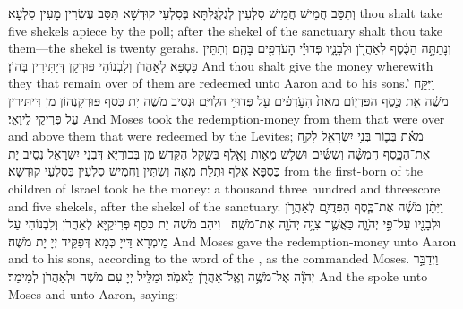 {וְתִסַּב חֲמֵישׁ חֲמֵישׁ סִלְעִין לְגֻלְגֻּלְתָּא בְּסִלְעֵי קוּדְשָׁא תִּסַּב עֶשְׂרִין מָעִין סִלְעָא׃}
{thou shalt take five shekels apiece by the poll; after the shekel of the sanctuary shalt thou take them—the shekel is twenty gerahs.}{}
{וְנָתַתָּ֣ה הַכֶּ֔סֶף לְאַהֲרֹ֖ן וּלְבָנָ֑יו פְּדוּיֵ֕י הָעֹדְפִ֖ים בָּהֶֽם׃}
{וְתִתֵּין כַּסְפָּא לְאַהֲרֹן וְלִבְנוֹהִי פּוּרְקַן דְּיַתִּירִין בְּהוֹן׃}
{And thou shalt give the money wherewith they that remain over of them are redeemed unto Aaron and to his sons.’}{}
{וַיִּקַּ֣ח מֹשֶׁ֔ה אֵ֖ת כֶּ֣סֶף הַפִּדְי֑וֹם מֵאֵת֙ הָעֹ֣דְפִ֔ים עַ֖ל פְּדוּיֵ֥י הַלְוִיִּֽם׃
}
{וּנְסֵיב מֹשֶׁה יָת כְּסַף פּוּרְקָנְהוֹן מִן דְּיַתִּירִין עַל פְּרִיקֵי לֵיוָאֵי׃}
{And Moses took the redemption-money from them that were over and above them that were redeemed by the Levites;}{}
{מֵאֵ֗ת בְּכ֛וֹר בְּנֵ֥י יִשְׂרָאֵ֖ל לָקַ֣ח אֶת־הַכָּ֑סֶף חֲמִשָּׁ֨ה וְשִׁשִּׁ֜ים וּשְׁלֹ֥שׁ מֵא֛וֹת וָאֶ֖לֶף בְּשֶׁ֥קֶל הַקֹּֽדֶשׁ׃
}
{מִן בְּכוֹרַיָּא דִּבְנֵי יִשְׂרָאֵל נְסֵיב יָת כַּסְפָּא אֶלֶף וּתְלָת מְאָה וְשִׁתִּין וַחֲמֵישׁ סִלְעִין בְּסִלְעֵי קוּדְשָׁא׃}
{from the first-born of the children of Israel took he the money: a thousand three hundred and threescore and five shekels, after the shekel of the sanctuary.}{}
{וַיִּתֵּ֨ן מֹשֶׁ֜ה אֶת־כֶּ֧סֶף הַפְּדֻיִ֛ם לְאַהֲרֹ֥ן וּלְבָנָ֖יו עַל־פִּ֣י יְהֹוָ֑ה כַּאֲשֶׁ֛ר צִוָּ֥ה יְהֹוָ֖ה אֶת־מֹשֶֽׁה׃ \petucha }
{וִיהַב מֹשֶׁה יָת כְּסַף פְּרִיקַיָּא לְאַהֲרֹן וְלִבְנוֹהִי עַל מֵימְרָא דַּייָ כְּמָא דְּפַקֵּיד יְיָ יָת מֹשֶׁה׃}
{And Moses gave the redemption-money unto Aaron and to his sons, according to the word of the \lord, as the \lord\space commanded Moses.}{}
\newperek
{}%
{וַיְדַבֵּ֣ר יְהֹוָ֔ה אֶל־מֹשֶׁ֥ה וְאֶֽל־אַהֲרֹ֖ן לֵאמֹֽר׃}
{וּמַלֵּיל יְיָ עִם מֹשֶׁה וּלְאַהֲרֹן לְמֵימַר׃}
{And the \lord\space spoke unto Moses and unto Aaron, saying:}{}
